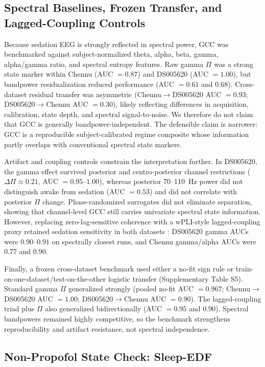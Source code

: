 \documentclass[11pt,a4paper]{article}
\theoremstyle{plain}
\theoremstyle{definition}
\theoremstyle{remark}
\begin{document}
\subsection{Spectral Baselines, Frozen Transfer, and Lagged-Coupling Controls}
\label{sec:spectral-controls}

Because sedation EEG is strongly reflected in spectral power, GCC was benchmarked against subject-normalized theta, alpha, beta, gamma, alpha/gamma ratio, and spectral entropy features. Raw gamma $\Pi$ was a strong state marker within Chennu (AUC $=0.87$) and DS005620 (AUC $=1.00$), but bandpower residualization reduced performance (AUC $=0.61$ and $0.68$). Cross-dataset residual transfer was asymmetric (Chennu$\to$DS005620 AUC $=0.93$; DS005620$\to$Chennu AUC $=0.30$), likely reflecting differences in acquisition, calibration, state depth, and spectral signal-to-noise. We therefore do not claim that GCC is generally bandpower-independent. The defensible claim is narrower: GCC is a reproducible subject-calibrated regime composite whose information partly overlaps with conventional spectral state markers.

Artifact and coupling controls constrain the interpretation further. In DS005620, the gamma effect survived posterior and centro-posterior channel restrictions ($\Delta\Pi\approx0.21$, AUC $=0.95$--$1.00$), whereas posterior 70--110~Hz power did not distinguish awake from sedation (AUC $=0.53$) and did not correlate with posterior $\Pi$ change. Phase-randomized surrogates did not eliminate separation, showing that channel-level GCC still carries univariate spectral state information. However, replacing zero-lag-sensitive coherence with a wPLI-style lagged-coupling proxy retained sedation sensitivity in both datasets \citep{vinck2011}: DS005620 gamma AUCs were $0.90$--$0.91$ on spectrally closest runs, and Chennu gamma/alpha AUCs were $0.77$ and $0.90$.

Finally, a frozen cross-dataset benchmark used either a no-fit sign rule or train-on-one-dataset/test-on-the-other logistic transfer (Supplementary Table S5). Standard gamma $\Pi$ generalized strongly (pooled no-fit AUC $=0.967$; Chennu$\to$DS005620 AUC $=1.00$; DS005620$\to$Chennu AUC $=0.90$). The lagged-coupling triad plus $\Pi$ also generalized bidirectionally (AUC $=0.95$ and $0.90$). Spectral bandpowers remained highly competitive, so the benchmark strengthens reproducibility and artifact resistance, not spectral independence.


\subsection{Non-Propofol State Check: Sleep-EDF}
\label{sec:sleep-edf}
\end{document}
